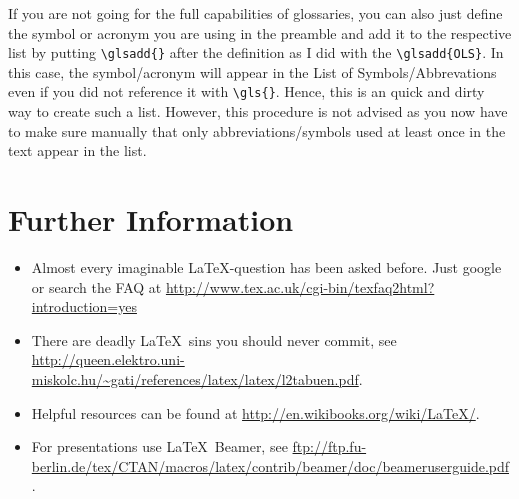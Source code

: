 \documentclass[a4paper,12pt]{scrartcl} %
\begin{document}
If you are not going for the full capabilities of glossaries, you can also just define the symbol or acronym you are using in the preamble and add it to the respective list by putting \verb|\glsadd{}| after the definition as I did with the \verb|\glsadd{OLS}|. In this case, the symbol/acronym will appear in the List of Symbols/Abbrevations even if you did not reference it with \verb|\gls{}|. Hence, this is an quick and dirty way to create such a list. However, this procedure is not advised as you now have to make sure manually that only abbreviations/symbols used at least once in the text appear in the list.



\section{Further Information}

\begin{itemize}
    \item Almost every imaginable \LaTeX-question has been asked before. Just google or search the FAQ at \url{http://www.tex.ac.uk/cgi-bin/texfaq2html?introduction=yes}
    \item There are deadly \LaTeX\ sins you should never commit, see \url{http://queen.elektro.uni-miskolc.hu/~gati/references/latex/latex/l2tabuen.pdf}.
    \item Helpful resources can be found at \url{http://en.wikibooks.org/wiki/LaTeX/}.
    \item For presentations use \LaTeX\ Beamer, see \url{ftp://ftp.fu-berlin.de/tex/CTAN/macros/latex/contrib/beamer/doc/beameruserguide.pdf}.
\end{itemize}


\clearpage


\onehalfspacing


\printbibliography %


\end{document}
